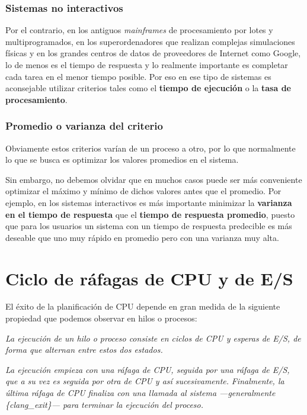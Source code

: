 \subsubsection{Sistemas no
interactivos}\label{_sistemas_no_interactivos}

Por el contrario, en los antiguos \emph{mainframes} de procesamiento por
lotes y multiprogramados, en los superordenadores que realizan complejas
simulaciones físicas y en los grandes centros de datos de proveedores de
Internet como Google, lo de menos es el tiempo de respuesta y lo
realmente importante es completar cada tarea en el menor tiempo posible.
Por eso en ese tipo de sistemas es aconsejable utilizar criterios tales
como el \textbf{tiempo de ejecución} o la \textbf{tasa de
procesamiento}.

\subsubsection{Promedio o varianza del
criterio}\label{_promedio_o_varianza_del_criterio}

Obviamente estos criterios varían de un proceso a otro, por lo que
normalmente lo que se busca es optimizar los valores promedios en el
sistema.

Sin embargo, no debemos olvidar que en muchos casos puede ser más
conveniente optimizar el máximo y mínimo de dichos valores antes que el
promedio. Por ejemplo, en los sistemas interactivos es más importante
minimizar la \textbf{varianza en el tiempo de respuesta} que el
\textbf{tiempo de respuesta promedio}, puesto que para los usuarios un
sistema con un tiempo de respuesta predecible es más deseable que uno
muy rápido en promedio pero con una varianza muy alta.

\section{Ciclo de ráfagas de CPU y de
E/S}\label{_ciclo_de_ruxe1fagas_de_cpu_y_de_es}

El éxito de la planificación de CPU depende en gran medida de la
siguiente propiedad que podemos observar en hilos o procesos:

\emph{La ejecución de un hilo o proceso consiste en ciclos de CPU y
esperas de E/S, de forma que alternan entre estos dos estados.}

\emph{La ejecución empieza con una ráfaga de CPU, seguida por una ráfaga
de E/S, que a su vez es seguida por otra de CPU y así sucesivamente.}
\emph{Finalmente, la última ráfaga de CPU finaliza con una llamada al
sistema ---generalmente \{clang\_exit\}--- para terminar la ejecución
del proceso.}


